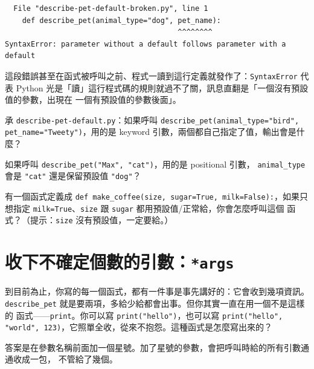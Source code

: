 \begin{verbatim}
  File "describe-pet-default-broken.py", line 1
    def describe_pet(animal_type="dog", pet_name):
                                        ^^^^^^^^
SyntaxError: parameter without a default follows parameter with a default
\end{verbatim}

這段錯誤甚至在函式被呼叫之前、程式一讀到這行定義就發作了：\texttt{SyntaxError} 代表
Python 光是「讀」這行程式碼的規則就過不了關，訊息直翻是「一個沒有預設值的參數，出現在
一個有預設值的參數後面」。


\begin{drills}[label=drills:function-params]
\item 承 \texttt{describe-pet-default.py}：如果呼叫 \texttt{describe\_pet(animal\_type="bird",
pet\_name="Tweety")}，用的是 keyword 引數，兩個都自己指定了值，輸出會是什麼？
\item 如果呼叫 \texttt{describe\_pet("Max", "cat")}，用的是 positional 引數，
\texttt{animal\_type} 會是 \texttt{"cat"} 還是保留預設值 \texttt{"dog"}？
\item 有一個函式定義成
\texttt{def make\_coffee(size, sugar=True, milk=False):}，如果只想指定
\texttt{milk=True}、\texttt{size} 跟 \texttt{sugar} 都用預設值/正常給，你會怎麼呼叫這個
函式？（提示：\texttt{size} 沒有預設值，一定要給。）
\end{drills}

\section{收下不確定個數的引數：\texttt{*args}}
\label{sec:function-args}

到目前為止，你寫的每一個函式，都有一件事是事先講好的：它會收到幾項資訊。
\texttt{describe\_pet} 就是要兩項，多給少給都會出事。但你其實一直在用一個不是這樣的
函式——\texttt{print}。你可以寫 \texttt{print("hello")}，也可以寫
\texttt{print("hello", "world", 123)}，它照單全收，從來不抱怨。這種函式是怎麼寫出來的？

答案是在參數名稱前面加一個星號。加了星號的參數，會把呼叫時給的所有引數通通收成一包，
不管給了幾個。

